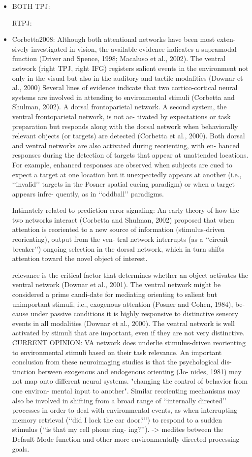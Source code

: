 \documentclass{article} %
\begin{document}
\begin{itemize}
\item
BOTH TPJ:


RTPJ:
\item
Corbetta2008:
Although both attentional networks have been most exten- sively investigated in vision, the available evidence indicates a supramodal function (Driver and Spence, 1998; Macaluso et al., 2002). The ventral network (right TPJ, right IFG) registers salient events in the environment not only in the visual but also in the auditory and tactile modalities (Downar et al., 2000)
Several lines of evidence indicate that two cortico-cortical neural systems are involved in attending to environmental stimuli (Corbetta and Shulman, 2002). A dorsal frontoparietal network. A second system, the ventral frontoparietal network, is not ac- tivated by expectations or task preparation but responds along with the dorsal network when behaviorally relevant objects (or targets) are detected (Corbetta et al., 2000). Both dorsal and ventral networks are also activated during reorienting, with en- hanced responses during the detection of targets that appear at unattended locations. For example, enhanced responses are observed when subjects are cued to expect a target at one location but it unexpectedly appears at another (i.e., ‘‘invalid’’ targets in the Posner spatial cueing paradigm)
or when a target appears infre- quently, as in ‘‘oddball’’ paradigms.

Intimately related to prediction error signaling:
An early theory of how the two networks interact (Corbetta and Shulman, 2002) proposed that when attention is reoriented to a new source 
of information (stimulus-driven reorienting), output from the ven- tral network interrupts (as a ‘‘circuit breaker’’) ongoing selection in the dorsal network, which in turn shifts attention toward the novel object of interest.

relevance is the critical factor that determines whether an object activates the ventral network (Downar et al., 2001). The ventral network might be considered a prime candi-date for mediating orienting to salient but unimportant stimuli, i.e., exogenous attention (Posner and Cohen, 1984), be- cause under passive conditions it is highly responsive to distinctive sensory
events in all modalities (Downar et al., 2000). The ventral network is well activated by stimuli that are important, even if they are not very distinctive. 
CURRENT OPINION: VA network does underlie  stimulus-driven reorienting to environmental stimuli based on their task relevance. An important conclusion from these neuroimaging studies is that the psychological dis- tinction between exogenous and endogenous orienting (Jo- nides, 1981) may not map onto different neural systems. "changing the control of behavior from one environ- mental input to another". Similar reorienting mechanisms may also be involved in shifting from a broad range of ‘‘internally directed’’ processes in order to deal with environmental events, as when interrupting memory retrieval (‘‘did I lock the car door?’’) to respond to a sudden stimulus (‘‘is that my cell phone ring- ing?’’). -> medites between the Default-Mode function and other more environmentally directed processing goals.


\end{itemize}
\end{document}
